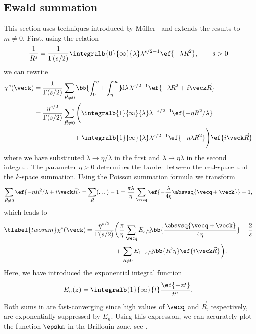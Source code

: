 \subsection{Ewald summation}
This section uses techniques introduced by Müller~\cite{Muller2010} and extends the results to $m\ne 0$.
First, using the relation
\begin{align}
    \frac{1}{R^s}=\frac{1}{\Gamma(s/2)} \integralb{0}{\infty}{\lambda} \lambda^{s/2-1} \ef{-\lambda R^2},\qquad s>0
\end{align}
we can rewrite
\begin{align}
    \chi^s(\veck)&=\frac{1}{\Gamma(s/2)}\sum_{\vec{R}\ne 0} \bb{\int_0^\eta + \int_\eta^\infty}\! \mathrm{d}\lambda\, \lambda^{s/2-1} \ef{-\lambda R^2 + i \veck \vec{R}} \\
                 &= \frac{\eta^{s/2}}{\Gamma(s/2)}\sum_{\vec{R}\ne 0} \Bigg(\integralb{1}{\infty}{\lambda} \lambda^{-s/2-1} \ef{-\eta R^2 / \lambda} \\
                 &\qquad\qquad\qquad+\integralb{1}{\infty}{\lambda} \lambda^{s/2-1} \ef{-\eta \lambda R^2} \Bigg) \ef{i\veck \vec{R}}
\end{align}
where we have substituted $\lambda \rightarrow \eta/\lambda$ in the first and $\lambda \rightarrow \eta \lambda$ in the second integral.
The parameter $\eta > 0$ determines the border between the real-space and the $k$-space summation.
Using the Poisson summation formula we transform
\begin{align}
    \sum_{\vec{R}\ne 0} \ef{-\eta R^2/\lambda + i \veck \vec{R}} = \sum_{\vec{R}} (\dots) - 1 = \frac{\pi\lambda}{\eta} \sum_{\vecq} \ef{-\frac{\lambda}{4\eta} \absvsq{\vecq+\veck}} - 1,
\end{align}
which leads to
\begin{align} \tlabel{twosum}
    \chi^s(\veck) &= \frac{\eta^{s/2}}{\Gamma(s/2)} \bigg(\frac{\pi}{\eta} \sum_{\vecq} E_{s/2}\!\bb{\frac{\absvsq{\vecq+\veck}}{4\eta}} - \frac{2}{s} \\
                  &\qquad\qquad\,\,\,+ \sum_{\vec{R}\ne 0} E_{1-s/2}\!\bb{R^2 \eta} \ef{i \veck \vec{R}} \bigg).
\end{align}
Here, we have introduced the exponential integral function
\begin{align}
    E_n(z) = \integralb{1}{\infty}{t} \frac{\ef{-z t}}{t^n}.
\end{align}
Both sums in  are fast-converging since high
values of $\vecq$ and $\vec{R}$, respectively, are exponentially suppressed by $E_n$.
Using this expression, we can accurately plot the function $\epskm$ in the Brillouin zone, see .


